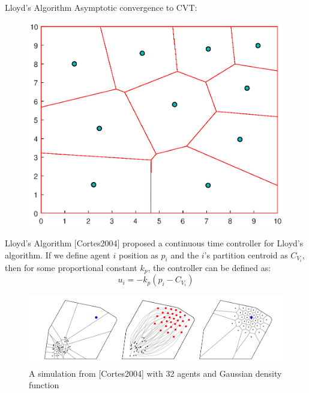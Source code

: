 \documentclass[t]{beamer}
\begin{document}
\begin{frame}[label=lloydsalg5]{Lloyd's Algorithm}
Asymptotic convergence to CVT:
\begin{figure}
\centering
\includegraphics[scale=0.6]{background/cvt-calc-stepn.eps}
\end{figure}
\end{frame}
\begin{frame}[label=lloydsalg6]{Lloyd's Algorithm}
[Cortes2004] proposed a continuous time controller for Lloyd's algorithm. If we define agent $i$ position as $p_i$ and the $i$'s partition centroid as $C_{V_{i}}$, then for some proportional constant $k_{p}$, the controller can be defined as:
\begin{equation*} \label{Lloyds contoller}
u_{i} = -k_{p}\left( p_i - C_{V_{i}} \right)
\end{equation*}

\begin{figure}[b]
\centering
\includegraphics[scale=0.3]{background/Lloyds-alg-from-cortes.png}
\caption{A simulation from [Cortes2004] with 32 agents and Gaussian density function}
\end{figure}
\end{frame}
\end{document}
